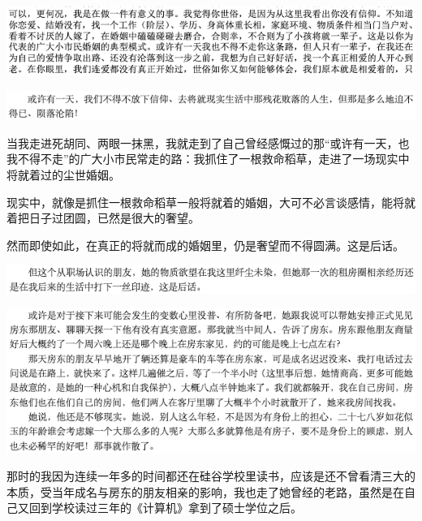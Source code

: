 \documentclass[9pt, b5paper]{article}
\begin{document}
\begin{center}
\includegraphics[width=.9\linewidth]{./pic/backups_plans_20210424_095212.png}
\end{center}

\begin{center}
\includegraphics[width=.9\linewidth]{./pic/backups_plans_20210424_095046.png}
\end{center}

当我走进死胡同、两眼一抹黑，我就走到了自己曾经感慨过的那“或许有一天，也我不得不走”的广大小市民常走的路：我抓住了一根救命稻草，走进了一场现实中将就着过的尘世婚姻。

现实中，就像是抓住一根救命稻草一般将就着的婚姻，大可不必言谈感情，能将就着把日子过团圆，已然是很大的奢望。

然而即使如此，在真正的将就而成的婚姻里，仍是奢望而不得圆满。这是后话。

\begin{center}
\includegraphics[width=.9\linewidth]{./pic/backups_plans_20210423_204215.png}
\end{center}

\begin{center}
\includegraphics[width=.9\linewidth]{./pic/backups_plans_20210423_204134.png}
\end{center}

那时的我因为连续一年多的时间都还在硅谷学校里读书，应该是还不曾看清三大的本质，受当年成名与房东的朋友相亲的影响，我也走了她曾经的老路，虽然是在自己又回到学校读过三年的《计算机》拿到了硕士学位之后。
\end{document}

